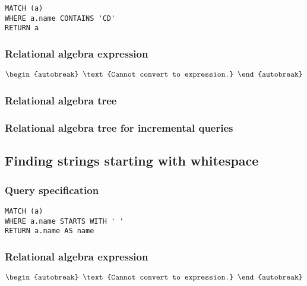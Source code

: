 \begin{lstlisting}
MATCH (a)
WHERE a.name CONTAINS 'CD'
RETURN a
\end{lstlisting}

\subsubsection*{Relational algebra expression}

\begin{align*}
\begin{autobreak}
\text{Cannot convert to expression.}
\end{autobreak}
\end{align*}

\subsubsection*{Relational algebra tree}


\subsubsection*{Relational algebra tree for incremental queries}


\subsection{Finding strings starting with whitespace}

\subsubsection*{Query specification}

\begin{lstlisting}
MATCH (a)
WHERE a.name STARTS WITH ' '
RETURN a.name AS name
\end{lstlisting}

\subsubsection*{Relational algebra expression}

\begin{align*}
\begin{autobreak}
\text{Cannot convert to expression.}
\end{autobreak}
\end{align*}

